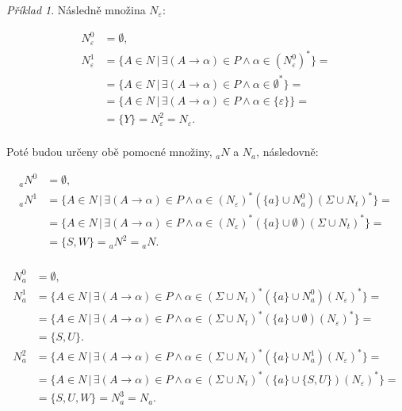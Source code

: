 \documentclass[a4paper, 12pt]{article}
\theoremstyle{definition}
\theoremstyle{definition}
\theoremstyle{definition}
\theoremstyle{remark}
\newtheorem{example}{Příklad}[section]
\begin{document}
\begin{example}
Následně množina $N_\varepsilon$:

\begin{align*}
    N_\varepsilon^0 &= \emptyset,\\
    N_\varepsilon^1 &= \{A \in N \, | \, \exists (A \rightarrow \alpha) \in P \wedge \alpha \in (N_\varepsilon^0)^\ast\} = \\
                    &= \{A \in N \, | \, \exists (A \rightarrow \alpha) \in P \wedge \alpha \in \emptyset^\ast\} = \\
                    &= \{A \in N \, | \, \exists (A \rightarrow \alpha) \in P \wedge \alpha \in \{\varepsilon\}\} = \\
                    &= \{Y\} = N_\varepsilon^2 = N_\varepsilon. \\
\end{align*}

Poté budou určeny obě pomocné množiny, ${}_{a}N$ a $N_a$, následovně:

\begin{align*}
    {}_{a}N^0 &= \emptyset,\\
    {}_{a}N^1 &= \{A \in N \, | \, \exists (A \rightarrow \alpha) \in P \wedge \alpha \in (N_{\varepsilon})^\ast(\{a\} \cup N_a^0)(\Sigma \cup N_t)^\ast\} = \\
              &= \{A \in N \, | \, \exists (A \rightarrow \alpha) \in P \wedge \alpha \in (N_{\varepsilon})^\ast(\{a\} \cup \emptyset)(\Sigma \cup N_t)^\ast\} = \\
              &= \{S, W\} = {}_{a}N^2 = {}_{a}N. \\
\end{align*}

\begin{align*}
    N_a^0 &= \emptyset,\\
    N_a^1 &= \{A \in N \, | \, \exists (A \rightarrow \alpha) \in P \wedge \alpha \in (\Sigma \cup N_t)^\ast(\{a\} \cup N_a^0)(N_{\varepsilon})^\ast\} = \\
          &= \{A \in N \, | \, \exists (A \rightarrow \alpha) \in P \wedge \alpha \in (\Sigma \cup N_t)^\ast(\{a\} \cup \emptyset)(N_{\varepsilon})^\ast\} = \\          
          &= \{S, U\}. \\
    N_a^2 &= \{A \in N \, | \, \exists (A \rightarrow \alpha) \in P \wedge \alpha \in (\Sigma \cup N_t)^\ast(\{a\} \cup N_a^1)(N_{\varepsilon})^\ast\} = \\
    &= \{A \in N \, | \, \exists (A \rightarrow \alpha) \in P \wedge \alpha \in (\Sigma \cup N_t)^\ast(\{a\} \cup \{S, U\})(N_{\varepsilon})^\ast\} = \\
    &= \{S, U, W\} = N_a^3 = N_a. \\
\end{align*}


\end{example}
\end{document}
